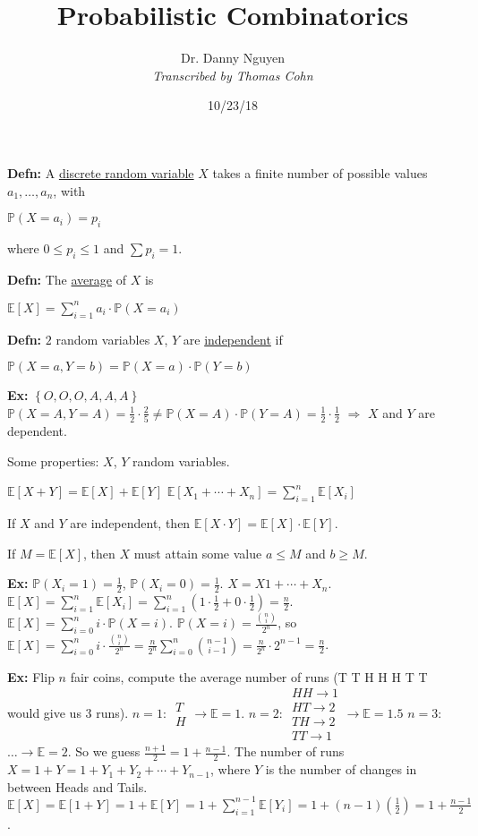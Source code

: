 \documentclass[10pt,letterpaper]{article}
\author{Dr. Danny Nguyen\\ \small\textit{Transcribed by Thomas Cohn}}
\title{Probabilistic Combinatorics}
\date{10/23/18} %
\newcommand{\n}{\hfill\break}
\newcommand{\defn}[1]{\par\noindent\settowidth{\hangindent}{\textbf{Defn: }}\textbf{Defn: }#1\n}
\newcommand{\ex}[1]{\par\noindent\settowidth{\hangindent}{\textbf{Ex: }}\textbf{Ex: }#1\n}
\newcommand{\inlineeq}[1]{\centerline{$\displaystyle #1$}}
\newcommand{\set}[1]{\left\{#1\right\}}
\newcommand{\Prob}{\mathbb{P}}
\newcommand{\Avg}[1]{\mathbb{E}\left[#1\right]}
\begin{document}
\maketitle
\setlength\RaggedRightParindent{\parindent}
\RaggedRight

\defn{A \underline{discrete random variable} $X$ takes a finite number of possible values $a_{1},\ldots,a_{n}$, with\n
\inlineeq{\Prob(X=a_{i})=p_{i}}
where $0\le{}p_{i}\le{}1$ and $\sum{}p_{i}=1$.}

\defn{The \underline{average} of $X$ is\n
\inlineeq{\Avg{X}=\sum_{i=1}^{n}a_{i}\cdot\Prob(X=a_{i})}}

\defn{$2$ random variables $X$, $Y$ are \underline{independent} if\n
\inlineeq{\Prob(X=a,Y=b)=\Prob(X=a)\cdot\Prob(Y=b)}}

\ex{$\set{O,O,O,A,A,A}$\n
$\Prob(X=A,Y=A)=\frac{1}{2}\cdot\frac{2}{5}\ne\Prob(X=A)\cdot\Prob(Y=A)=\frac{1}{2}\cdot\frac{1}{2}$\n
$\Rightarrow$ $X$ and $Y$ are dependent.}

\par\noindent Some properties:\n
$X$, $Y$ random variables.\n

\par\noindent $\Avg{X+Y}=\Avg{X}+\Avg{Y}$\n
$\displaystyle\Avg{X_{1}+\cdots+X_{n}}=\sum_{i=1}^{n}\Avg{X_{i}}$\n

\par\noindent If $X$ and $Y$ are independent, then\n
$\Avg{X\cdot{}Y}=\Avg{X}\cdot\Avg{Y}$.\n

\par\noindent If $M=\Avg{X}$, then $X$ must attain some value $a\le{}M$ and $b\ge{}M$.\n

\ex{$\Prob(X_{i}=1)=\frac{1}{2}$, $\Prob(X_{i}=0)=\frac{1}{2}$.\n
$X=X{1}+\cdots+X_{n}$.\n
$\displaystyle\Avg{X}=\sum_{i=1}^{n}\Avg{X_{i}}=\sum_{i=1}^{n}\left(1\cdot\frac{1}{2}+0\cdot\frac{1}{2}\right)=\frac{n}{2}$.\n
$\displaystyle\Avg{X}=\sum_{i=0}^{n}i\cdot\Prob(X=i)$.\n
\n
$\displaystyle\Prob(X=i)=\frac{\binom{n}{i}}{2^{n}}$, so $\displaystyle\Avg{X}=\sum_{i=0}^{n}i\cdot\frac{\binom{n}{i}}{2^{n}}=\frac{n}{2^{n}}\sum_{i=0}^{n}\binom{n-1}{i-1}=\frac{n}{2^{n}}\cdot{}2^{n-1}=\frac{n}{2}$.}

\newpage
\ex{Flip $n$ fair coins, compute the average number of runs (T T H H H T T would give us 3 runs).\n
\n
$n=1$: $\begin{array}{l}T\\ H\end{array}\to\mathbb{E}=1$.\n
$n=2$: $\begin{array}{l}HH\to{}1\\ HT\to{}2\\ TH\to{}2\\ TT\to{}1\end{array}\to\mathbb{E}=1.5$\n
$n=3$: $\ldots\to\mathbb{E}=2$.\n
\n
So we guess $\frac{n+1}{2}=1+\frac{n-1}{2}$.\n
\n
The number of runs $X=1+Y=1+Y_{1}+Y_{2}+\cdots+Y_{n-1}$, where $Y$ is the number of changes in between Heads and Tails.\n
$\displaystyle\Avg{X}=\Avg{1+Y}=1+\Avg{Y}=1+\sum_{i=1}^{n-1}\Avg{Y_{i}}=1+(n-1)(\frac{1}{2})=1+\frac{n-1}{2}$.}
\end{document}
